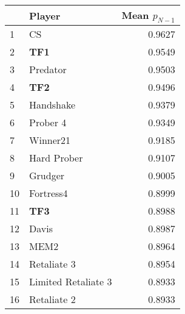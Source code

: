 \begin{tabular}{llr}
\toprule
{} &               Player &  Mean $p_{N-1}$ \\
\midrule
1  &                   CS &          0.9627 \\
2  &                  \textbf{TF1} &          0.9549 \\
3  &             Predator &          0.9503 \\
4  &                  \textbf{TF2} &          0.9496 \\
5  &            Handshake &          0.9379 \\
6  &             Prober 4 &          0.9349 \\
7  &             Winner21 &          0.9185 \\
8  &          Hard Prober &          0.9107 \\
9  &              Grudger &          0.9005 \\
10 &            Fortress4 &          0.8999 \\
11 &                  \textbf{TF3} &          0.8988 \\
12 &                Davis &          0.8987 \\
13 &                 MEM2 &          0.8964 \\
14 &          Retaliate 3 &          0.8954 \\
15 &  Limited Retaliate 3 &          0.8933 \\
16 &          Retaliate 2 &          0.8933 \\
\bottomrule
\end{tabular}
